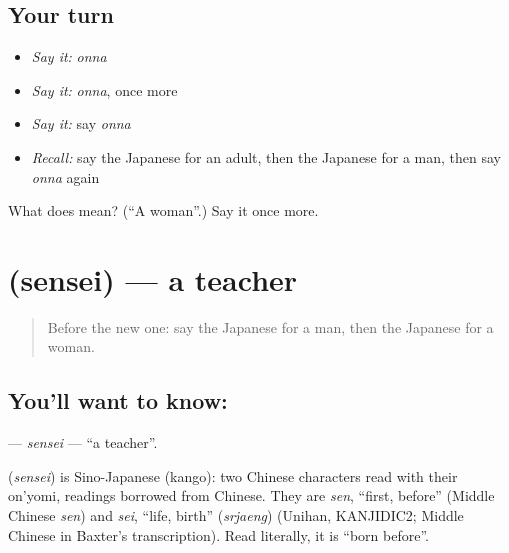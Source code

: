 \subsection*{Your turn}
\begin{itemize}
\raggedright
  \item \emph{Say it:} \emph{onna}
  \item \emph{Say it:} \emph{onna}, once more
  \item \emph{Say it:} say \emph{onna}
  \item \emph{Recall:} say the Japanese for an adult, then the Japanese for a man, then say \emph{onna} again
\end{itemize}

\begin{tcolorbox}[breakable,colback=teal!4,colframe=teal!35!black,title={Before you move on}]
What does  mean? (\textquotedblleft{}A woman\textquotedblright{}.) Say it once more.
\end{tcolorbox}
\section[\texorpdfstring{\ja{せんせい} (sensei)}{せんせい (sensei)}]{ (sensei) — a teacher}

\label{lesson:JA-C25-sensei}



\begin{quote}
Before the new one: say the Japanese for a man, then the Japanese for a woman.
\end{quote}

\subsection*{You'll want to know: }
\textbf{} — \emph{sensei} — \textquotedblleft{}a teacher\textquotedblright{}.

\begin{cousinweb}
\textbf{} (\emph{sensei}) is Sino-Japanese (kango): two Chinese characters read with their on'yomi, readings borrowed from Chinese. They are \emph{sen}, \textquotedblleft{}first, before\textquotedblright{} (Middle Chinese \emph{sen}) and \emph{sei}, \textquotedblleft{}life, birth\textquotedblright{} (\emph{srjaeng}) (Unihan, KANJIDIC2; Middle Chinese in Baxter's transcription). Read literally, it is \textquotedblleft{}born before\textquotedblright{}.
\end{cousinweb}

